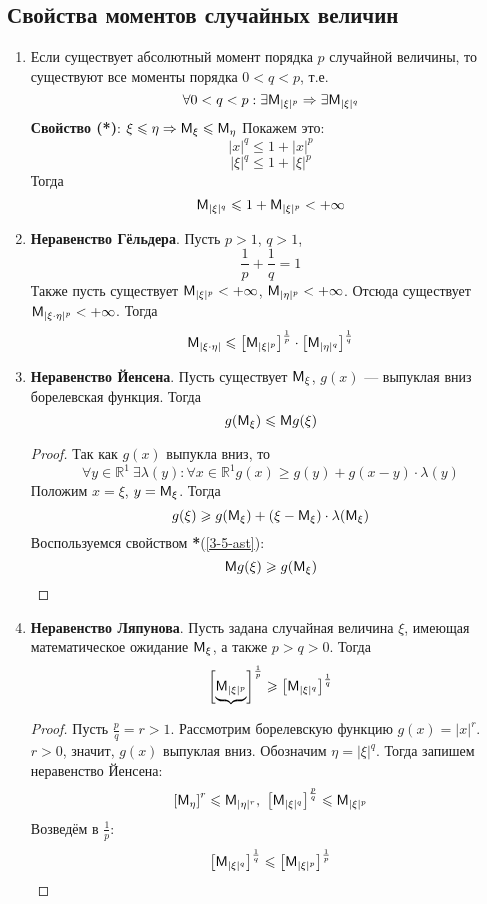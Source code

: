 \subsection{Свойства моментов случайных величин}
\begin{enumerate}
  \item Если существует абсолютный момент порядка $p$ случайной величины, то существуют все моменты порядка $0 < q < p$, т.е.
  \[
    \forall 0 < q < p : \exists \mathsf{M}_{|\xi|^p} \Rightarrow \exists \mathsf{M}_{|\xi|^q}
  \]
  \textbf{Свойство (*)}: $\xi \leqslant \eta \Rightarrow \mathsf{M}_{\xi} \leqslant \mathsf{M}_{\eta}$ \label{3-5-ast}
  Покажем это:
  \[
    |x|^q \leqslant 1 + |x|^p
  \]
  \[
    |\xi|^q \leqslant 1 + |\xi|^p
  \]
  Тогда
  \[
    \mathsf{M}_{|\xi|^q} \leqslant 1 + \mathsf{M}_{|\xi|^p} < +\infty
  \]

  \item \textbf{Неравенство Гёльдера}. Пусть $p > 1$, $q > 1$,
  \[
    \frac{1}{p} + \frac{1}{q} = 1
  \]
  Также пусть существует $\mathsf{M}_{|\xi|^p} < +\infty$, $\mathsf{M}_{|\eta|^p} < +\infty$. Отсюда существует $\mathsf{M}_{|\xi \cdot \eta|^p} < +\infty$. Тогда
  \[
    \mathsf{M}_{|\xi \cdot \eta|} \leqslant \left[ \mathsf{M}_{|\xi|^p} \right]^{\frac{1}{p}} \cdot \left[ \mathsf{M}_{|\eta|^q} \right]^{\frac{1}{q}}
  \]
  \item \textbf{Неравенство Йенсена}. Пусть существует $\mathsf{M}_{\xi}$, $g(x)$ --- выпуклая вниз борелевская функция. Тогда
  \[
    g(\mathsf{M}_{\xi}) \leqslant \mathsf{M} g(\xi)
  \]
  \begin{proof}
    Так как $g(x)$ выпукла вниз, то
    \[
      \forall y \in \mathbb{R}^1 \ \exists \lambda(y) : \forall x \in \mathbb{R}^1 g(x) \geqslant g(y) + g(x-y) \cdot \lambda(y)
    \]
    Положим $x = \xi$, $y = \mathsf{M}_{\xi}$. Тогда
    \[
      g(\xi) \geqslant g(\mathsf{M}_{\xi}) + (\xi - \mathsf{M}_{\xi}) \cdot \lambda (\mathsf{M}_{\xi})
    \]
    Воспользуемся свойством \textbf{*}(\ref{3-5-ast}):
    \[
      \mathsf{M} g(\xi) \geqslant g(\mathsf{M}_{\xi})
    \]
  \end{proof}
  \item \textbf{Неравенство Ляпунова}. Пусть задана случайная величина $\xi$, имеющая математическое ожидание $\mathsf{M}_{\xi}$, а также $p > q > 0$. Тогда
  \[
    \left[ \underbrace{\mathsf{M}_{|\xi|^p}}  \right]^{\frac{1}{p}} \geqslant \left[ \mathsf{M}_{|\xi|^q} \right]^{\frac{1}{q}}
  \]
  \begin{proof}
    Пусть $\frac{p}{q} = r > 1$. Рассмотрим борелевскую функцию $g(x) = |x|^r$. $r > 0$, значит, $g(x)$ выпуклая вниз. Обозначим $\eta = |\xi|^q$. Тогда запишем неравенство Йенсена:
    \[
      \left[ \mathsf{M}_{\eta} \right]^r \leqslant \mathsf{M}_{|\eta|^r}, \
      \left[ \mathsf{M}_{|\xi|^q} \right]^{\frac{p}{q}} \leqslant \mathsf{M}_{|\xi|^p}
    \]
    Возведём в $\frac{1}{p}$:
    \[
      \left[ \mathsf{M}_{|\xi|^q} \right]^{\frac{1}{q}} \leqslant \left[ \mathsf{M}_{|\xi|^p} \right]^{\frac{1}{p}}
    \]
  \end{proof}
\end{enumerate}
